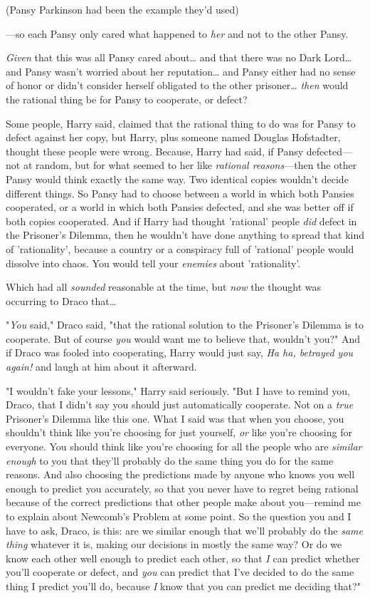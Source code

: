 (Pansy Parkinson had been the example they'd used)

---so each Pansy only cared what happened to \emph{her} and not to the other 
Pansy.

\emph{Given} that this was all Pansy cared about{\ldots} and that there was no 
Dark Lord{\ldots} and Pansy wasn't worried about her reputation{\ldots} and 
Pansy either had no sense of honor or didn't consider herself obligated to the 
other prisoner{\ldots} \emph{then} would the rational thing be for Pansy to 
cooperate, or defect?

Some people, Harry said, claimed that the rational thing to do was for Pansy to 
defect against her copy, but Harry, plus someone named Douglas Hofstadter, 
thought these people were wrong. Because, Harry had said, if Pansy 
defected---not at random, but for what seemed to her like \emph{rational 
reasons}---then the other Pansy would think exactly the same way. Two identical 
copies wouldn't decide different things. So Pansy had to choose between a world 
in which both Pansies cooperated, or a world in which both Pansies defected, 
and she was better off if both copies cooperated. And if Harry had thought 
'rational' people \emph{did} defect in the Prisoner's Dilemma, then he wouldn't 
have done anything to spread that kind of 'rationality', because a country or a 
conspiracy full of 'rational' people would dissolve into chaos. You would tell 
your \emph{enemies} about 'rationality'.

Which had all \emph{sounded} reasonable at the time, but \emph{now} the thought 
was occurring to Draco that{\ldots}

"\emph{You} said," Draco said, "that the rational solution to the Prisoner's 
Dilemma is to cooperate. But of course \emph{you} would want me to believe 
that, wouldn't you?" And if Draco was fooled into cooperating, Harry would just 
say, \emph{Ha ha, betrayed you again!} and laugh at him about it afterward.

"I wouldn't fake your lessons," Harry said seriously. "But I have to remind 
you, Draco, that I didn't say you should just automatically cooperate. Not on a 
\emph{true} Prisoner's Dilemma like this one. What I said was that when you 
choose, you shouldn't think like you're choosing for just yourself, \emph{or} 
like you're choosing for everyone. You should think like you're choosing for 
all the people who are \emph{similar enough} to you that they'll probably do 
the same thing you do for the same reasons. And also choosing the predictions 
made by anyone who knows you well enough to predict you accurately, so that you 
never have to regret being rational because of the correct predictions that 
other people make about you---remind me to explain about Newcomb's Problem at 
some point. So the question you and I have to ask, Draco, is this: are we 
similar enough that we'll probably do the \emph{same thing} whatever it is, 
making our decisions in mostly the same way? Or do we know each other well 
enough to predict each other, so that \emph{I} can predict whether you'll 
cooperate or defect, and \emph{you} can predict that I've decided to do the 
same thing I predict you'll do, because \emph{I} know that you can predict me 
deciding that?"


